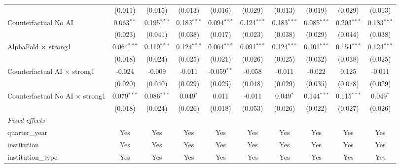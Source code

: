 \begin{tabular}{lccccccccc}
                                          & (0.011)       & (0.015)       & (0.013)       & (0.016)       & (0.029)       & (0.013)       & (0.019)       & (0.029)       & (0.013)\\   
   Counterfactual No AI                   & 0.063$^{**}$  & 0.195$^{***}$ & 0.183$^{***}$ & 0.094$^{***}$ & 0.124$^{***}$ & 0.183$^{***}$ & 0.085$^{***}$ & 0.203$^{***}$ & 0.183$^{***}$\\   
                                          & (0.023)       & (0.041)       & (0.038)       & (0.017)       & (0.023)       & (0.038)       & (0.029)       & (0.044)       & (0.038)\\   
   AlphaFold $\times$ strong1             & 0.064$^{***}$ & 0.119$^{***}$ & 0.124$^{***}$ & 0.064$^{***}$ & 0.091$^{***}$ & 0.124$^{***}$ & 0.101$^{***}$ & 0.154$^{***}$ & 0.124$^{***}$\\   
                                          & (0.018)       & (0.024)       & (0.025)       & (0.021)       & (0.026)       & (0.025)       & (0.032)       & (0.038)       & (0.025)\\   
   Counterfactual AI $\times$ strong1     & -0.024        & -0.009        & -0.011        & -0.059$^{**}$ & -0.058        & -0.011        & -0.022        & 0.125         & -0.011\\   
                                          & (0.020)       & (0.040)       & (0.029)       & (0.025)       & (0.048)       & (0.029)       & (0.035)       & (0.078)       & (0.029)\\   
   Counterfactual No AI $\times$ strong1  & 0.079$^{***}$ & 0.086$^{***}$ & 0.049$^{*}$   & 0.011         & -0.011        & 0.049$^{*}$   & 0.144$^{***}$ & 0.115$^{***}$ & 0.049$^{*}$\\   
                                          & (0.018)       & (0.024)       & (0.026)       & (0.018)       & (0.053)       & (0.026)       & (0.022)       & (0.027)       & (0.026)\\   
   \midrule
   \emph{Fixed-effects}\\
   quarter\_year                          & Yes           & Yes           & Yes           & Yes           & Yes           & Yes           & Yes           & Yes           & Yes\\  
   institution                            & Yes           & Yes           & Yes           & Yes           & Yes           & Yes           & Yes           & Yes           & Yes\\  
   institution\_type                      & Yes           & Yes           & Yes           & Yes           & Yes           & Yes           & Yes           & Yes           & Yes\\  

\end{tabular}

